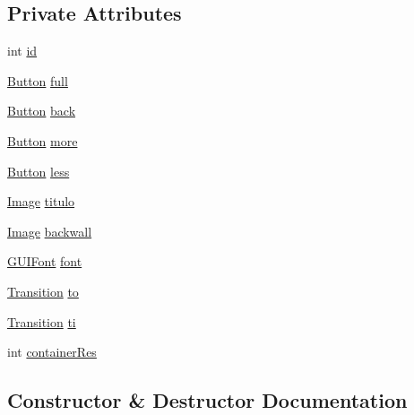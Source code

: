 \subsection*{Private Attributes}
\begin{DoxyCompactItemize}
\item 
int \mbox{\hyperlink{classstates_1_1_options_state_a55f5f77b21511b9bb3a1c306bf81c091}{id}}
\item 
\mbox{\hyperlink{classgui_1_1_button}{Button}} \mbox{\hyperlink{classstates_1_1_options_state_a904fabe1b3ae80f7ff9ea5a22d0dbc88}{full}}
\item 
\mbox{\hyperlink{classgui_1_1_button}{Button}} \mbox{\hyperlink{classstates_1_1_options_state_a3126dfa1dd586fed0c1dfd6ab5176e01}{back}}
\item 
\mbox{\hyperlink{classgui_1_1_button}{Button}} \mbox{\hyperlink{classstates_1_1_options_state_a1364460866ca32c9a1b1a53306ff76f9}{more}}
\item 
\mbox{\hyperlink{classgui_1_1_button}{Button}} \mbox{\hyperlink{classstates_1_1_options_state_a1f00eafc225107c0e4665632a30e0718}{less}}
\item 
\mbox{\hyperlink{classorg_1_1newdawn_1_1slick_1_1_image}{Image}} \mbox{\hyperlink{classstates_1_1_options_state_af4b29604629c41f9baeabdde2d2daec2}{titulo}}
\item 
\mbox{\hyperlink{classorg_1_1newdawn_1_1slick_1_1_image}{Image}} \mbox{\hyperlink{classstates_1_1_options_state_a258584e2d75daa51de1788b6791cb3f7}{backwall}}
\item 
\mbox{\hyperlink{classgui_1_1_g_u_i_font}{G\+U\+I\+Font}} \mbox{\hyperlink{classstates_1_1_options_state_a6a6834f7d7a3704e0a42aac50a50ae3f}{font}}
\item 
\mbox{\hyperlink{interfaceorg_1_1newdawn_1_1slick_1_1state_1_1transition_1_1_transition}{Transition}} \mbox{\hyperlink{classstates_1_1_options_state_a2aed557634da4727c19dd8f0e90af333}{to}}
\item 
\mbox{\hyperlink{interfaceorg_1_1newdawn_1_1slick_1_1state_1_1transition_1_1_transition}{Transition}} \mbox{\hyperlink{classstates_1_1_options_state_a0b8ab7b471d09e2aa1d6e1026ed7a634}{ti}}
\item 
int \mbox{\hyperlink{classstates_1_1_options_state_aac5803e0583bd7dc8e5e1a9327d9a0c0}{container\+Res}}
\end{DoxyCompactItemize}


\subsection{Constructor \& Destructor Documentation}
\mbox{\label{classstates_1_1_options_state_a8ececa696cb63624887652040f6f81d6}} 
